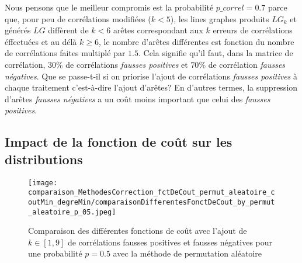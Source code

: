 \documentclass[onecolumn, 12pt]{book}
\begin{document}
Nous pensons que le meilleur compromis est la probabilit\'e $p\_correl = 0.7$ parce que, pour peu de corr\'elations modifi\'ees ($k<5$), les lines graphes produits $LG_k$ et g\'en\'er\'es $LG$ diff\`erent de $k<6$ ar\^etes correspondant aux $k$ erreurs de  corr\'elations \'effectu\'ees  et au d\'el\`a $k \geq 6$, le nombre d'ar\^etes diff\'erentes est fonction du nombre de corr\'elations faites multipl\'e par $1.5$.
Cela signifie qu'il faut, dans la matrice de corr\'elation, $30\%$ de corr\'elations {\em fausses positives} et $70\%$ de corr\'elation {\em fausses n\'egatives}. 
\newline
Que se passe-t-il si on priorise l'ajout de corr\'elations {\em fausses positives} \`a chaque traitement c'est-\`a-dire l'ajout d'ar\^etes?  
En d'autres termes, la suppression d'ar\^etes {\em fausses n\'egatives} a un co\^ut moins important que celui des {\em fausses positives}. 

\subsection{Impact de la fonction de co\^ut sur les distributions}
\label{fonctionDeCout}

\begin{figure}[htb!] 
\centering
\texttt{[image: comparaison\_MethodesCorrection\_fctDeCout\_permut\_aleatoire\_coutMin\_degreMin/comparaisonDifferentesFonctDeCout\_by\_permut\_aleatoire\_p\_05.jpeg]}
\caption{ Comparaison des diff\'erentes fonctions de co\^ut avec l'ajout de $k \in [1,9]$ de corr\'elations fausses positives et fausses n\'egatives pour une probabilit\'e $p = 0.5$ avec la m\'ethode de permutation al\'eatoire }
\label{compareDifferentesFonctionDeCout_p05} 
\end{figure}
\end{document}
